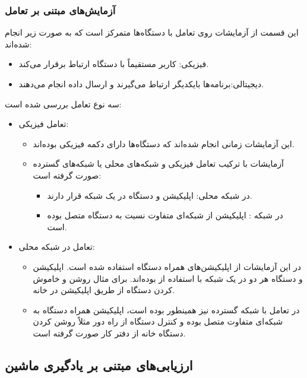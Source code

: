 \subsubsection{آزمایش‌های مبتنی بر تعامل}

این قسمت از آزمایشات روی تعامل با دستگاه‌ها متمرکز است که به صورت زیر انجام
شده‌اند:

\begin{itemize}
    \item فیزیکی: کاربر مستقیماً با دستگاه ارتباط برقرار می‌کند.
    \item دیجیتالی:‌برنامه‌ها بایکدیگر ارتباط می‌گیرند و ارسال داده انجام
    می‌دهند.
\end{itemize}

سه نوع تعامل بررسی شده است:

\begin{itemize}
    \item تعامل فیزیکی:
    \begin{itemize}
        \item این آزمایشات زمانی انجام شده‌اند که دستگاه‌ها دارای دکمه فیزیکی
        بوده‌اند.
        \item آزمایشات با ترکیب تعامل فیزیکی و شبکه‌های محلی یا شبکه‌های گسترده
        صورت گرفته است:
        \begin{itemize}
            \item در شبکه محلی: اپلیکیشن و دستگاه در یک شبکه قرار دارند.
            \item در شبکه : اپلیکیشن از شبکه‌ای متفاوت نسبت به دستگاه
            متصل بوده است.
        \end{itemize}
    \end{itemize}
    \item تعامل در شبکه محلی:
    \begin{itemize}
        \item در این آزمایشات از اپلیکیشن‌های همراه دستگاه استفاده شده است.
        اپلیکیشن و دستگاه هر دو در یک شبکه با استفاده از  بوده‌اند.
        برای مثال روشن و خاموش کردن دستگاه از طریق اپلیکیشن در خانه.
        \item در تعامل با شبکه گسترده نیز همینطور بوده است، اپلیکیشن همراه
        دستگاه به شبکه‌ای متفاوت متصل بوده و کنترل دستگاه از راه دور مثلاً روشن
        کردن دستگاه خانه از دفتر کار صورت گرفته است.
    \end{itemize}
\end{itemize}

\subsection{ارزیابی‌های مبتنی بر یادگیری ماشین}

